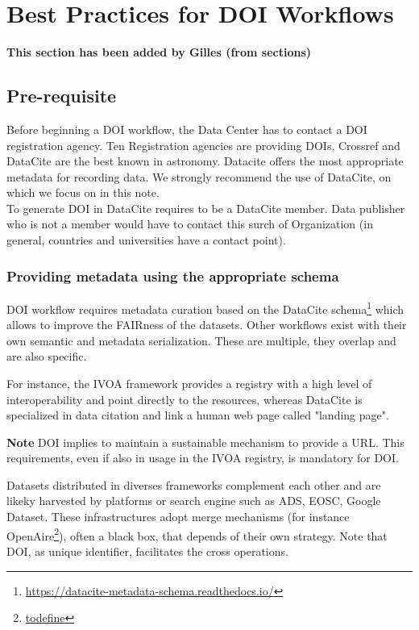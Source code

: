 \documentclass[11pt,a4paper]{ivoa}
\newcommand{\important}[1]{
	\begin{bigdescription}
		\item \color{ivoacolor}\textbf{Note} #1
	\end{bigdescription}
}
\begin{document}
\section{Best Practices for DOI Workﬂows}
\textbf{\color{red}This section has been added by Gilles (from sections)}

\subsection{Pre-requisite}

Before beginning a DOI workflow, the Data Center has to contact a DOI registration agency.
Ten Registration agencies are providing DOIs, Crossref and DataCite are the best known in astronomy. 
Datacite offers the most appropriate metadata for recording data. We strongly recommend the use of DataCite, on which we focus on in this note.\\

To generate DOI in DataCite requires to be a DataCite member. Data publisher who is not a member would have to contact this surch of Organization (in general, countries and universities have a contact point).


\subsubsection{Providing metadata using the appropriate schema}
\label{sec:bestpractice:providing}
DOI workflow requires metadata curation based on the DataCite schema\footnote{\url{https://datacite-metadata-schema.readthedocs.io/}} which allows to improve the FAIRness of the datasets. Other workflows exist with their own semantic and metadata serialization. These are multiple, they overlap and are also specific.

For instance, the IVOA framework provides a registry with a high level  of interoperability and point directly to the resources, whereas DataCite is specialized in data citation and link a human web page called "landing page".

\important{
DOI implies to maintain a sustainable mechanism to provide a URL. 
This requirements, even if also in usage in the IVOA registry, is mandatory for DOI.
}

Datasets distributed in diverses frameworks complement each other and are likeky harvested by platforms or search engine such as ADS, EOSC, Google Dataset. These infrastructures adopt merge mechanisms (for instance OpenAire\footnote{\url{todefine}}), often a black box, that depends of their own strategy. Note that DOI, as unique identifier, facilitates the cross operations.
\end{document}
